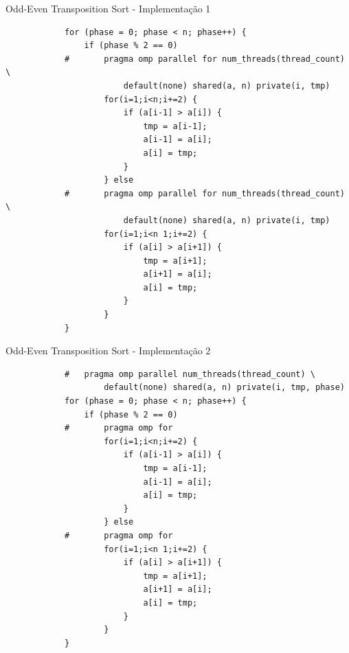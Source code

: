 	\begin{frame}[fragile]{Odd-Even Transposition Sort - Implementação 1}
		\begin{verbatim}
			for (phase = 0; phase < n; phase++) { 
				if (phase % 2 == 0)
			#		pragma omp parallel for num_threads(thread_count) \ 
						default(none) shared(a, n) private(i, tmp)
					for(i=1;i<n;i+=2) { 
						if (a[i-1] > a[i]) {
							tmp = a[i-1]; 
							a[i-1] = a[i]; 
							a[i] = tmp;
						} 
					} else
			#		pragma omp parallel for num_threads(thread_count) \
						default(none) shared(a, n) private(i, tmp) 
					for(i=1;i<n 1;i+=2) {
						if (a[i] > a[i+1]) { 
							tmp = a[i+1]; 
							a[i+1] = a[i]; 
							a[i] = tmp;
						}
					}
			} 
		\end{verbatim}
\end{frame}


	\begin{frame}[fragile]{Odd-Even Transposition Sort - Implementação 2}
		\begin{verbatim}
			# 	pragma omp parallel num_threads(thread_count) \ 
					default(none) shared(a, n) private(i, tmp, phase)
			for (phase = 0; phase < n; phase++) { 
				if (phase % 2 == 0)
			#		pragma omp for
					for(i=1;i<n;i+=2) { 
						if (a[i-1] > a[i]) {
							tmp = a[i-1]; 
							a[i-1] = a[i]; 
							a[i] = tmp;
						} 
					} else
			#		pragma omp for
					for(i=1;i<n 1;i+=2) {
						if (a[i] > a[i+1]) { 
							tmp = a[i+1]; 
							a[i+1] = a[i]; 
							a[i] = tmp;
						}
					}
			} 
		\end{verbatim}
\end{frame}


